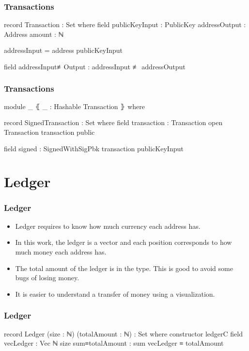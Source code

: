 \documentclass{beamer}
\begin{document}
\begin{frame}
  \frametitle{Transactions}
\begin{code}
  record Transaction : Set where
    field
      publicKeyInput : PublicKey
      addressOutput  : Address
      amount         : ℕ

    addressInput = address publicKeyInput

    field
      addressInput≢Output : addressInput ≢ addressOutput

\end{code}
\end{frame}

\begin{frame}
  \frametitle{Transactions}
\begin{code}

  module _ ⦃ _ : Hashable Transaction ⦄ where

    record SignedTransaction  : Set where
      field
        transaction : Transaction
      open Transaction transaction public

      field
        signed : SignedWithSigPbk transaction publicKeyInput
\end{code}
\end{frame}

\section{Ledger}

\begin{frame}
  \frametitle{Ledger}
   \begin{itemize}[<+->]
     \item Ledger requires to know how much currency each address has.
     \item In this work, the ledger is a vector and each position corresponds to how much money each address has.
     \item The total amount of the ledger is in the type. This is good to avoid some bugs of losing money.
     \item It is easier to understand a transfer of money using a visualization.
   \end{itemize}
\end{frame}


\begin{frame}
  \frametitle{Ledger}
\begin{code}
record Ledger (size : ℕ) (totalAmount : ℕ) : Set where
  constructor ledgerC
  field
    vecLedger       : Vec ℕ size
    sum≡totalAmount : sum vecLedger ≡ totalAmount
\end{code}
\end{frame}
\end{document}
